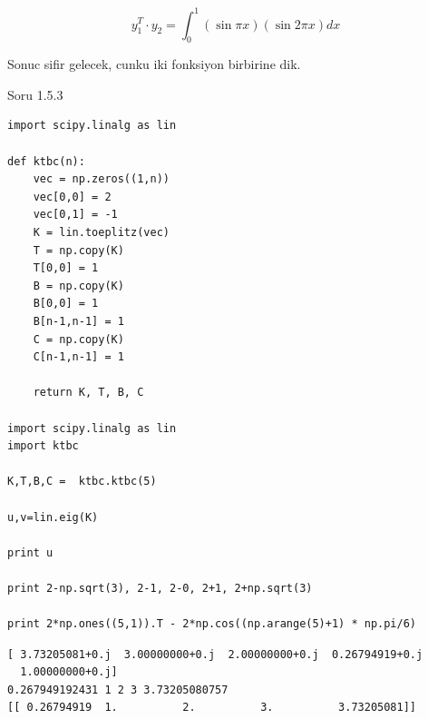 \documentclass[12pt,fleqn]{article}\usepackage{../common}
\begin{document}
\[ y_1^T \cdot y_2  = \int_0^1 (\sin \pi x)(\sin 2\pi x)dx  \]

Sonuc sifir gelecek, cunku iki fonksiyon birbirine dik.

Soru 1.5.3

\begin{verbatim}
import scipy.linalg as lin

def ktbc(n):
    vec = np.zeros((1,n))
    vec[0,0] = 2
    vec[0,1] = -1
    K = lin.toeplitz(vec)
    T = np.copy(K)
    T[0,0] = 1
    B = np.copy(K)
    B[0,0] = 1
    B[n-1,n-1] = 1
    C = np.copy(K)
    C[n-1,n-1] = 1
    
    return K, T, B, C

import scipy.linalg as lin
import ktbc

K,T,B,C =  ktbc.ktbc(5)

u,v=lin.eig(K)

print u

print 2-np.sqrt(3), 2-1, 2-0, 2+1, 2+np.sqrt(3)

print 2*np.ones((5,1)).T - 2*np.cos((np.arange(5)+1) * np.pi/6)
\end{verbatim}

\begin{verbatim}
[ 3.73205081+0.j  3.00000000+0.j  2.00000000+0.j  0.26794919+0.j
  1.00000000+0.j]
0.267949192431 1 2 3 3.73205080757
[[ 0.26794919  1.          2.          3.          3.73205081]]
\end{verbatim}
\end{document}
